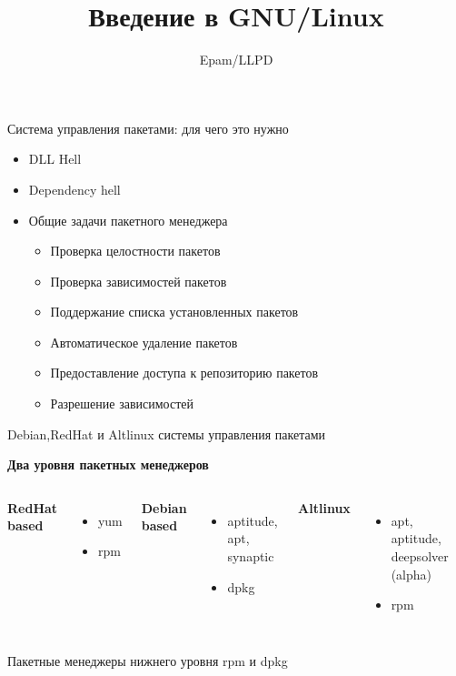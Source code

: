 \documentclass[ignorenonframetext, professionalfonts, hyperref={pdftex, unicode}]{beamer}
\title{Введение в GNU/Linux}
\author{Epam/LLPD}
\begin{document}
\frame{
	\tableofcontents
}

\begin{frame}{Система управления пакетами: для чего это нужно}
\begin{itemize}
 \item DLL Hell
 \item Dependency hell
 \item Общие задачи пакетного менеджера
   \begin{itemize}
     \item Проверка целостности пакетов
     \item Проверка зависимостей пакетов
        \item Поддержание списка установленных пакетов
        \item Автоматическое удаление пакетов
     \item Предоставление доступа к репозиторию пакетов
     \item Разрешение зависимостей
   \end{itemize}
\end{itemize}
\end{frame}
\begin{frame}{Debian,RedHat и Altlinux системы управления пакетами}
\begin{center}
 \textbf{Два уровня пакетных менеджеров}
\end{center}
\begin{columns}
  \begin{center}
    \textbf{RedHat based}
  \end{center}
  \begin{itemize}
    \item yum
    \item rpm
  \end{itemize}
  \begin{center}
    \textbf{Debian based}
  \end{center}
  \begin{itemize}
    \item aptitude, apt, synaptic
    \item dpkg
  \end{itemize}
  \begin{center}
    \textbf{Altlinux}
  \end{center}
  \begin{itemize}
    \item apt, aptitude, deepsolver (alpha)
    \item rpm
  \end{itemize}
\end{columns}
\end{frame} 
\begin{frame}{Пакетные менеджеры нижнего уровня rpm и dpkg}
\end{frame}
\end{document}
